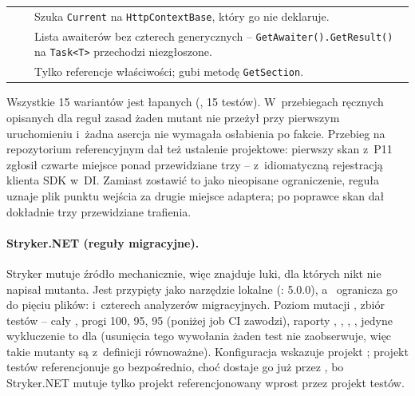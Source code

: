 \begin{xltabular}{\linewidth}{@{}>{\raggedright\arraybackslash}p{6.9cm} >{\raggedright\arraybackslash}p{2.6cm} >{\raggedright\arraybackslash}X@{}}
 &  & Szuka \texttt{Current} na \texttt{HttpContextBase}, który go nie deklaruje. \\
 &  & Lista awaiterów bez czterech generycznych -- \texttt{GetAwaiter().GetResult()} na \texttt{Task<T>} przechodzi niezgłoszone. \\
 &  & Tylko referencje właściwości; gubi metodę \texttt{GetSection}. \\
\bottomrule
\end{xltabular}
\endgroup

Wszystkie 15 wariantów jest łapanych (, 15 testów). W~przebiegach
ręcznych opisanych dla reguł zasad żaden mutant nie przeżył przy pierwszym uruchomieniu
i~żadna asercja nie wymagała osłabienia po fakcie. Przebieg
na repozytorium referencyjnym dał też ustalenie projektowe: pierwszy skan z~P11 zgłosił
czwarte miejsce ponad przewidziane trzy --  z~idiomatyczną rejestracją
klienta SDK w~DI. Zamiast zostawić to jako nieopisane ograniczenie, reguła uznaje plik punktu
wejścia za drugie miejsce adaptera; po poprawce skan dał dokładnie trzy przewidziane trafienia.

\paragraph{Stryker.NET (reguły migracyjne).} Stryker mutuje źródło mechanicznie, więc znajduje
luki, dla których nikt nie napisał mutanta. Jest przypięty jako narzędzie lokalne
(:  5.0.0), a~
ogranicza go do pięciu plików:  i~czterech analyzerów
migracyjnych. Poziom mutacji , zbiór testów -- cały
, progi  100,  95,
 95 (poniżej job CI zawodzi), raporty ,
, , , jedyne wykluczenie to
 dla  (usunięcia tego wywołania
żaden test nie zaobserwuje, więc takie mutanty są z~definicji równoważne).
Konfiguracja wskazuje projekt ; projekt testów
referencjonuje go bezpośrednio, choć dostaje go już przez , bo
Stryker.NET mutuje tylko projekt referencjonowany wprost przez projekt testów.

